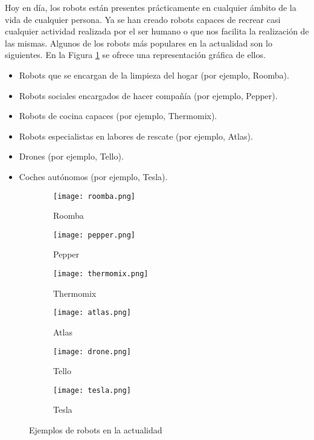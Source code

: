 Hoy en día, los robots están presentes prácticamente en cualquier ámbito de la vida de cualquier persona. Ya se han creado robots capaces de recrear casi cualquier actividad realizada por el ser humano o que nos facilita la realización de las mismas. Algunos de los robots más populares en la actualidad son lo siguientes. En la Figura \ref{fig:EjemplosRobots} se ofrece una representación gráfica de ellos.
\begin{itemize}
\item Robots que se encargan de la limpieza del hogar (por ejemplo, Roomba).
\item Robots sociales encargados de hacer compañía (por ejemplo, Pepper).
\item Robots de cocina capaces (por ejemplo, Thermomix).
\item Robots especialistas en labores de rescate (por ejemplo, Atlas).
\item Drones (por ejemplo, Tello).
\item Coches autónomos (por ejemplo, Tesla).
\end{itemize} 

\begin{figure}[!tbp]
  \begin{subfigure}[b]{0.4\textwidth}
    \texttt{[image: roomba.png]}
    \caption{Roomba}
  \end{subfigure}
  \hfill
  \begin{subfigure}[b]{0.4\textwidth}
    \texttt{[image: pepper.png]}
    \caption{Pepper}
  \end{subfigure}
    \hfill
  \begin{subfigure}[b]{0.4\textwidth}
    \texttt{[image: thermomix.png]}
    \caption{Thermomix}
  \end{subfigure}
    \hfill
  \begin{subfigure}[b]{0.4\textwidth}
    \texttt{[image: atlas.png]}
    \caption{Atlas}
  \end{subfigure}
      \hfill
  \begin{subfigure}[b]{0.4\textwidth}
    \texttt{[image: drone.png]}
    \caption{Tello}
  \end{subfigure}
      \hfill
  \begin{subfigure}[b]{0.4\textwidth}
    \texttt{[image: tesla.png]}
    \caption{Tesla}
  \end{subfigure}
\caption{Ejemplos de robots en la actualidad}
\label{fig:EjemplosRobots}
\end{figure}


